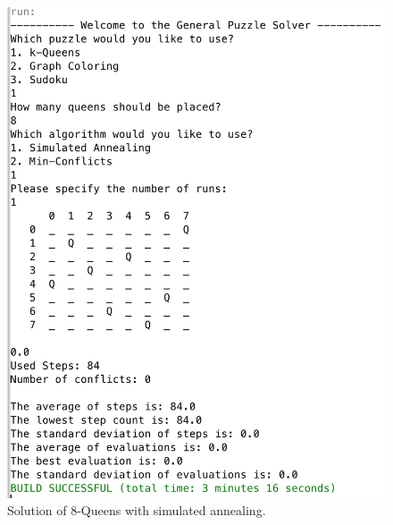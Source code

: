 \documentclass{scrartcl}
\begin{document}
 \begin{figure}[!htbp]
 \includegraphics[width=1.0\linewidth]{graphics/queens-sa.png}
\caption{Solution of 8-Queens with simulated annealing.}\label{fig:queens-sa}
 \end{figure}
 
\end{document}
